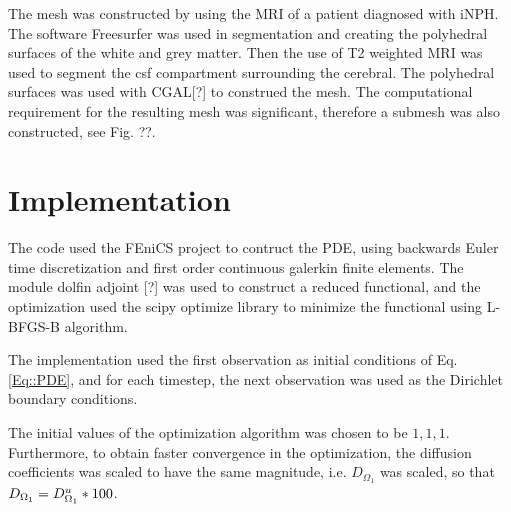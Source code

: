 \documentclass[11pt,a4paper]{article}
\begin{document}
The mesh was constructed by using the MRI of a patient diagnosed with iNPH. The software Freesurfer was used in segmentation and creating the polyhedral surfaces of the white and grey matter. Then the use of T2 weighted MRI was used to segment the csf compartment surrounding the cerebral. The polyhedral surfaces was used with CGAL[?] to construed the mesh. The computational requirement for the resulting mesh was significant, therefore a submesh was also constructed, see Fig. ??. 


\section*{Implementation}
The code used the FEniCS project to contruct the PDE, using backwards Euler time discretization and first order continuous galerkin finite elements. The module dolfin adjoint [?] was used to construct a reduced functional, and the optimization used the scipy optimize library to minimize the functional using L-BFGS-B algorithm.   

The implementation used the first observation as initial conditions of Eq.\ref{Eq::PDE}, and for each timestep, the next observation was used as the Dirichlet boundary conditions.  

The initial values of the optimization algorithm was chosen to be $1,1,1$. Furthermore, to obtain faster convergence in the optimization, the diffusion coefficients was scaled to have the same magnitude, i.e.  $D_{\Omega_1}$ was scaled, so that $D_{\Omega_1} = D\sp{u}_{\Omega_1}*100$.    
\end{document}
